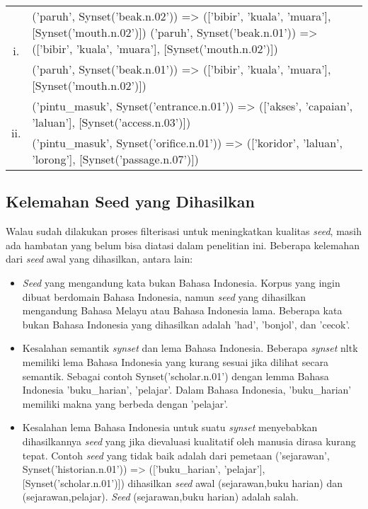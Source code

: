 \begin{center}
\begin{tabular}{ |c|m{30em}| } 
\hline
\multirow{2}{*}{i.} & ('paruh', Synset('beak.n.02')) => (['bibir', 'kuala', 'muara'], [Synset('mouth.n.02')])
('paruh', Synset('beak.n.01')) => (['bibir', 'kuala', 'muara'], [Synset('mouth.n.02')]) \\ 
& ('paruh', Synset('beak.n.01')) => (['bibir', 'kuala', 'muara'], [Synset('mouth.n.02')]) \\ 
\hline
\multirow{2}{*}{ii.} & ('pintu\_masuk', Synset('entrance.n.01')) => (['akses', 'capaian', 'laluan'], [Synset('access.n.03')]) \\ 
& ('pintu\_masuk', Synset('orifice.n.01')) => (['koridor', 'laluan', 'lorong'], [Synset('passage.n.07')]) \\ 
\hline
\end{tabular}
\end{center}

\subsection{Kelemahan Seed yang Dihasilkan}
Walau sudah dilakukan proses filterisasi untuk meningkatkan kualitas \textit{seed}, masih ada hambatan yang belum bisa diatasi dalam penelitian ini. Beberapa kelemahan dari \textit{seed} awal yang dihasilkan, antara lain:
\begin{itemize}
  \item \textit{Seed} yang mengandung kata bukan Bahasa Indonesia. Korpus yang ingin dibuat berdomain Bahasa Indonesia, namun \textit{seed} yang dihasilkan mengandung Bahasa Melayu atau Bahasa Indonesia lama. Beberapa kata bukan Bahasa Indonesia yang dihasilkan adalah 'had', 'bonjol', dan 'cecok'.
  \item Kesalahan semantik \textit{synset} dan lema Bahasa Indonesia. Beberapa \textit{synset} nltk memiliki lema Bahasa Indonesia yang kurang sesuai jika dilihat secara semantik. Sebagai contoh Synset('scholar.n.01') dengan lemma Bahasa Indonesia {'buku_harian', 'pelajar'}. Dalam Bahasa Indonesia, 'buku_harian' memiliki makna yang berbeda dengan 'pelajar'.
  \item Kesalahan lema Bahasa Indonesia untuk suatu \textit{synset} menyebabkan dihasilkannya \textit{seed} yang jika dievaluasi kualitatif oleh manusia dirasa kurang tepat. Contoh \textit{seed} yang tidak baik adalah dari pemetaan ('sejarawan', Synset('historian.n.01')) => (['buku_harian', 'pelajar'], [Synset('scholar.n.01')]) dihasilkan \textit{seed} awal (sejarawan,buku harian) dan (sejarawan,pelajar). \textit{Seed} (sejarawan,buku harian) adalah salah.
\end{itemize}


